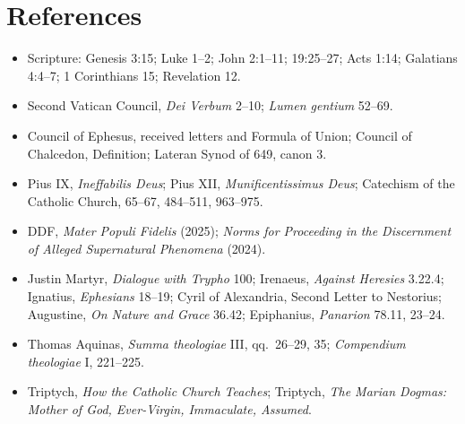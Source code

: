 \section{References}
\begin{itemize}
\item Scripture: Genesis 3:15; Luke 1--2; John 2:1--11; 19:25--27; Acts 1:14;
Galatians 4:4--7; 1 Corinthians 15; Revelation 12.
\item Second Vatican Council, \emph{Dei Verbum} 2--10; \emph{Lumen gentium}
52--69.
\item Council of Ephesus, received letters and Formula of Union; Council of
Chalcedon, Definition; Lateran Synod of 649, canon 3.
\item Pius IX, \emph{Ineffabilis Deus}; Pius XII, \emph{Munificentissimus
Deus}; Catechism of the Catholic Church, 65--67, 484--511, 963--975.
\item DDF, \emph{Mater Populi Fidelis} (2025); \emph{Norms for Proceeding in
the Discernment of Alleged Supernatural Phenomena} (2024).
\item Justin Martyr, \emph{Dialogue with Trypho} 100; Irenaeus,
\emph{Against Heresies} 3.22.4; Ignatius, \emph{Ephesians} 18--19; Cyril of
Alexandria, Second Letter to Nestorius; Augustine, \emph{On Nature and Grace}
36.42; Epiphanius, \emph{Panarion} 78.11, 23--24.
\item Thomas Aquinas, \emph{Summa theologiae} III, qq.~26--29, 35;
\emph{Compendium theologiae} I, 221--225.
\item Triptych, \emph{How the Catholic Church Teaches}; Triptych,
\emph{The Marian Dogmas: Mother of God, Ever-Virgin, Immaculate, Assumed}.
\end{itemize}


